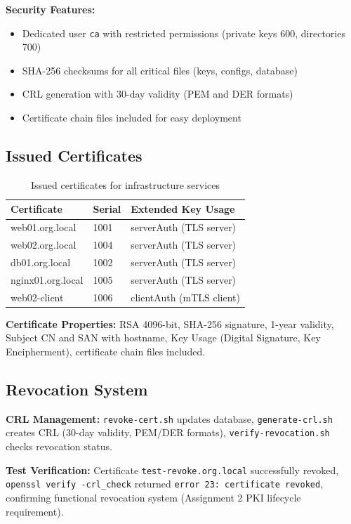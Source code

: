 \textbf{Security Features:}
\begin{itemize}
    \item Dedicated user \texttt{ca} with restricted permissions (private keys 600, directories 700)
    \item SHA-256 checksums for all critical files (keys, configs, database)
    \item CRL generation with 30-day validity (PEM and DER formats)
    \item Certificate chain files included for easy deployment
\end{itemize}

\subsection{Issued Certificates}

\begin{table}[h]
\centering
\begin{tabular}{|l|l|l|}
\hline
\textbf{Certificate} & \textbf{Serial} & \textbf{Extended Key Usage} \\
\hline
web01.org.local & 1001 & serverAuth (TLS server) \\
web02.org.local & 1004 & serverAuth (TLS server) \\
db01.org.local & 1002 & serverAuth (TLS server) \\
nginx01.org.local & 1005 & serverAuth (TLS server) \\
web02-client & 1006 & clientAuth (mTLS client) \\
\hline
\end{tabular}
\caption{Issued certificates for infrastructure services}
\end{table}

\textbf{Certificate Properties:} RSA 4096-bit, SHA-256 signature, 1-year validity, Subject CN and SAN with hostname, Key Usage (Digital Signature, Key Encipherment), certificate chain files included.

\subsection{Revocation System}

\textbf{CRL Management:} \texttt{revoke-cert.sh} updates database, \texttt{generate-crl.sh} creates CRL (30-day validity, PEM/DER formats), \texttt{verify-revocation.sh} checks revocation status.

\textbf{Test Verification:} Certificate \texttt{test-revoke.org.local} successfully revoked, \texttt{openssl verify -crl\_check} returned \texttt{error 23: certificate revoked}, confirming functional revocation system (Assignment 2 PKI lifecycle requirement).
